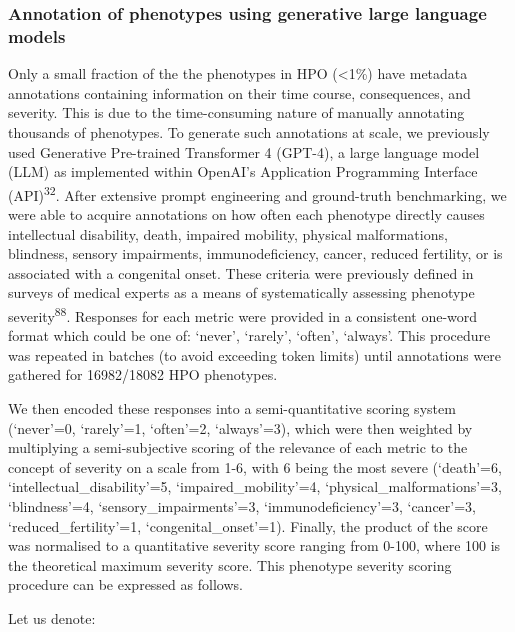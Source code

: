 \documentclass[
]{article}
\begin{document}
\subsubsection{Annotation of phenotypes using generative large language
models}\label{annotation-of-phenotypes-using-generative-large-language-models-1}

Only a small fraction of the the phenotypes in HPO (\textless1\%) have
metadata annotations containing information on their time course,
consequences, and severity. This is due to the time-consuming nature of
manually annotating thousands of phenotypes. To generate such
annotations at scale, we previously used Generative Pre-trained
Transformer 4 (GPT-4), a large language model (LLM) as implemented
within OpenAI's Application Programming Interface
(API)\textsuperscript{32}. After extensive prompt engineering and
ground-truth benchmarking, we were able to acquire annotations on how
often each phenotype directly causes intellectual disability, death,
impaired mobility, physical malformations, blindness, sensory
impairments, immunodeficiency, cancer, reduced fertility, or is
associated with a congenital onset. These criteria were previously
defined in surveys of medical experts as a means of systematically
assessing phenotype severity\textsuperscript{88}. Responses for each
metric were provided in a consistent one-word format which could be one
of: `never', `rarely', `often', `always'. This procedure was repeated in
batches (to avoid exceeding token limits) until annotations were
gathered for 16982/18082 HPO phenotypes.

We then encoded these responses into a semi-quantitative scoring system
(`never'=0, `rarely'=1, `often'=2, `always'=3), which were then weighted
by multiplying a semi-subjective scoring of the relevance of each metric
to the concept of severity on a scale from 1-6, with 6 being the most
severe (`death'=6, `intellectual\_disability'=5, `impaired\_mobility'=4,
`physical\_malformations'=3, `blindness'=4, `sensory\_impairments'=3,
`immunodeficiency'=3, `cancer'=3, `reduced\_fertility'=1,
`congenital\_onset'=1). Finally, the product of the score was normalised
to a quantitative severity score ranging from 0-100, where 100 is the
theoretical maximum severity score. This phenotype severity scoring
procedure can be expressed as follows.

Let us denote:
\end{document}
